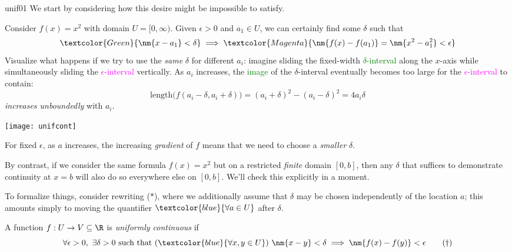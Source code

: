 \begin{example}{}{unif01}
	We start by considering how this desire might be impossible to satisfy.\par
	\begin{minipage}[t]{0.6\linewidth}\vspace{-3pt}
		Consider $f(x)=x^2$ with domain $U=[0,\infty)$. Given $\epsilon>0$ and $a_1\in U$, we can certainly find some\footnotemark{} $\delta$ such that
		\[
			\textcolor{Green}{\nm{x-a_1}<\delta}\implies \textcolor{Magenta}{\nm{f(x)-f(a_1)}=\nm{x^2-a_1^2}<\epsilon}
		\]
		Visualize what happens if we try to use the \emph{same} $\delta$ for different $a_i$: imagine sliding the fixed-width \textcolor{Green}{$\delta$-interval} along the $x$-axis while simultaneously sliding the \textcolor{Magenta}{$\epsilon$-interval} vertically. As $a_i$ increases, the \textcolor{Green}{image} of the $\delta$-interval eventually becomes too large for the \textcolor{Magenta}{$\epsilon$-interval} to contain:
		\[
			\text{length}\bigl(f(a_i-\delta,a_i+\delta)\bigr) =(a_i+\delta)^2-(a_i-\delta)^2=4a_i\delta
		\]
		\emph{increases unboundedly} with $a_i$.
	\end{minipage}
	\hfill
	\begin{minipage}[t]{0.39\linewidth}\vspace{0pt}
		\flushright\texttt{[image: unifcont]}
	\end{minipage}\smallbreak
	
	For fixed $\epsilon$, as $a$ increases, the increasing \emph{gradient} of $f$ means that we need to choose a \emph{smaller} $\delta$.\medbreak
	
	By contrast, if we consider the same formula $f(x)=x^2$ but on a restricted \emph{finite} domain $[0,b]$, then any $\delta$ that suffices to demonstrate continuity at $x=b$ will also do so everywhere else on $[0,b]$. We'll check this explicitly in a moment.
\end{example}


To formalize things, consider rewriting ($\ast$), where we additionally assume that $\delta$ may be chosen independently of the location $a$; this amounts simply to moving the quantifier $\textcolor{blue}{\forall a\in U}$ after $\delta$.

\begin{defn}{}{}
	A function $f:U\to V\subseteq \R$ is \emph{uniformly continuous} if
	\[
		\forall\epsilon>0,\ \exists\delta>0\text{ such that }(\textcolor{blue}{\forall x,y\in U})\ \nm{x-y}<\delta\implies\nm{f(x)-f(y)}<\epsilon \tag{$\dag$}
	\]
\end{defn}

